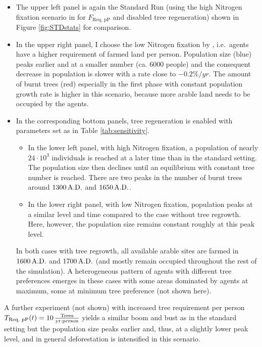 \begin{itemize}
	\item The upper left panel is again the Standard Run (using the high Nitrogen fixation scenario in \citet{Puleston2017} for $F_\text{Req, pP}$ and disabled tree regeneration) shown in Figure \ref{fig:STDstats} for comparison.
	\item In the upper right panel, I choose the low Nitrogen fixation by  \citet{Puleston2017}, i.e.\ agents have a higher requirement of farmed land per person.
	Population size (blue) peaks earlier and at a smaller number (ca. $6000$ people) and the consequent decrease in population is slower with a rate close to $-0.2\%/yr$.
	The amount of burnt trees (red) especially in the first phase with constant population growth rate is higher in this scenario, because more arable land needs to be occupied by the agents.
	\item In the corresponding bottom panels, tree regeneration is enabled with parameters set as in Table \ref{tab:sensitivity}. 
	\begin{itemize}
		\item In the lower left panel, with high Nitrogen fixation, a population of nearly $24\cdot10^3$ individuals is reached at a later time than in the standard setting. The population size then declines until an equilibrium with constant tree number is reached.
		There are two peaks in the number of burnt trees around $1300\, {\rm A.D.}$ and $1650\, {\rm A.D.}$.
		\item In the lower right panel, with low Nitrogen fixation, population peaks at a similar level and time compared to the case without tree regrowth.
		Here, however, the population size remains constant roughly at this peak level.
	\end{itemize}
	In both cases with tree regrowth, all available arable sites are farmed in $1600\, {\rm A.D.}$ and $1700\, {\rm A.D.}$ (and mostly remain occupied throughout the rest of the simulation).	
	A heterogeneous pattern of agents with different tree preferences emerges in these cases with some areas dominated by agents at maximum, some at minimum tree preference (not shown here).
\end{itemize}
A further experiment (not shown) with increased tree requirement per person $T_\text{Req, pP}(t)=10\,{\rm \frac{Trees}{yr\cdot person}}$ yields a similar boom and bust as in the standard setting but the population size peaks earlier and, thus, at a slightly lower peak level, and in general deforestation is intensified in this scenario.
 
